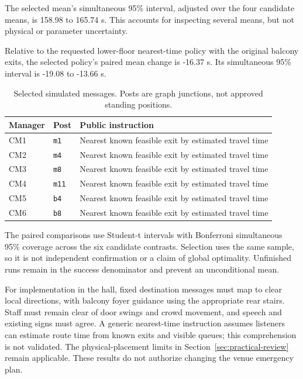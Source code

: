 The selected mean's simultaneous 95\% interval, adjusted over the four candidate means, is 158.98 to 165.74 s. This accounts for inspecting several means, but not physical or parameter uncertainty.

Relative to the requested lower-floor nearest-time policy with the original balcony exits, the selected policy's paired mean change is -16.37 s. Its simultaneous 95\% interval is -19.08 to -13.66 s.

\begin{table}[htbp]\centering\small

\begin{tabularx}{\linewidth}{llX}\toprule

Manager & Post & Public instruction\\\midrule

CM1 & \texttt{m1} & Nearest known feasible exit by estimated travel time\\

CM2 & \texttt{m4} & Nearest known feasible exit by estimated travel time\\

CM3 & \texttt{m8} & Nearest known feasible exit by estimated travel time\\

CM4 & \texttt{m11} & Nearest known feasible exit by estimated travel time\\

CM5 & \texttt{b4} & Nearest known feasible exit by estimated travel time\\

CM6 & \texttt{b8} & Nearest known feasible exit by estimated travel time\\

\bottomrule\end{tabularx}

\caption{Selected simulated messages. Posts are graph junctions, not approved standing positions.}\end{table}

The paired comparisons use Student-t intervals with Bonferroni simultaneous 95\% coverage across the six candidate contrasts. Selection uses the same sample, so it is not independent confirmation or a claim of global optimality. Unfinished runs remain in the success denominator and prevent an unconditional mean.

For implementation in the hall, fixed destination messages must map to clear local directions, with balcony foyer guidance using the appropriate rear stairs. Staff must remain clear of door swings and crowd movement, and speech and existing signs must agree. A generic nearest-time instruction assumes listeners can estimate route time from known exits and visible queues; this comprehension is not validated. The physical-placement limits in Section~\ref{sec:practical-review} remain applicable. These results do not authorize changing the venue emergency plan.



